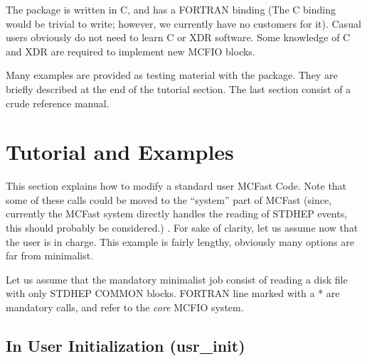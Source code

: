 	The package is written in C, and has a FORTRAN binding  (The
C binding would be trivial to write; however, we currently have no customers
for it).  Casual users obviously do not need to learn C or XDR software. Some
knowledge of C and XDR are required to implement new MCFIO blocks.

	Many examples are provided as testing material with the package.
They are briefly described at the end of the tutorial section. The last
section consist of a crude reference manual.

\section{Tutorial and Examples}


This section explains how to modify a standard user MCFast Code. Note that  some of
these calls could be moved to the ``system'' part of MCFast (since, currently
the MCFast system directly handles the  reading of STDHEP events, this  should
probably be considered.) . For sake of clarity, let us assume now that the
user is in charge. This example is fairly lengthy, obviously many  options are
far from minimalist.

\vspace{.1in}
  Let us assume that the mandatory  minimalist job
consist of reading a disk file with only STDHEP COMMON blocks. FORTRAN line
marked with a * are mandatory calls, and refer to the {\em core } MCFIO
system.


\subsection{In User Initialization (usr\_init)}

